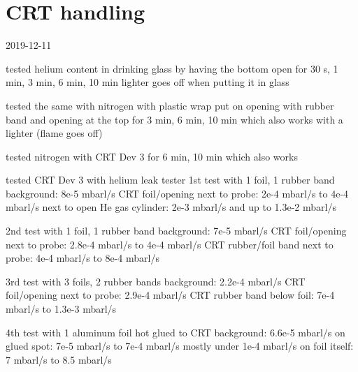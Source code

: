 
\chapter{CRT handling}
\label{chap:CRT handling}

2019-12-11

tested helium content in drinking glass by having the bottom open for 30 s, 1 min, 3 min, 6 min, 10 min
lighter goes off when putting it in glass

tested the same with nitrogen with plastic wrap put on opening with rubber band and opening at the top for 3 min, 6 min, 10 min which also works with a lighter (flame goes off)

tested nitrogen with CRT Dev 3 for 6 min, 10 min which also works

tested CRT Dev 3 with helium leak tester
1st test with 1 foil, 1 rubber band
background: 8e-5 mbarl/s
CRT foil/opening next to probe: 2e-4 mbarl/s  to 4e-4 mbarl/s
next to open He gas cylinder: 2e-3 mbarl/s and up to 1.3e-2 mbarl/s

2nd test with 1 foil, 1 rubber band
background: 7e-5 mbarl/s
CRT foil/opening next to probe: 2.8e-4 mbarl/s to 4e-4 mbarl/s
CRT rubber/foil band next to probe: 4e-4 mbarl/s to 8e-4 mbarl/s

3rd test with 3 foils, 2 rubber bands
background: 2.2e-4 mbarl/s
CRT foil/opening next to probe: 2.9e-4 mbarl/s
CRT rubber band below foil: 7e-4 mbarl/s to 1.3e-3 mbarl/s

4th test with 1 aluminum foil hot glued to CRT
background: 6.6e-5 mbarl/s
on glued spot: 7e-5 mbarl/s to 7e-4 mbarl/s mostly under 1e-4 mbarl/s 
on foil itself: 7 mbarl/s to 8.5 mbarl/s